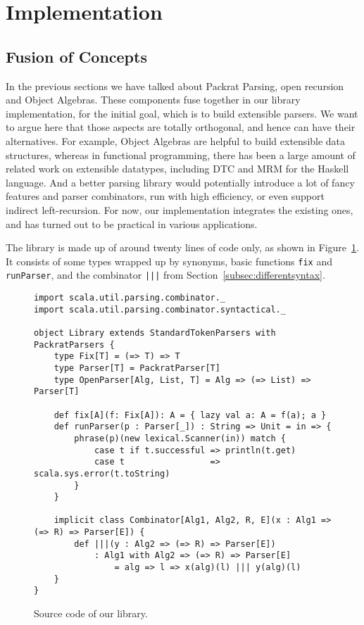 \section{Implementation}\label{sec:implementation}

\subsection{Fusion of Concepts}\label{subsec:fusion}

In the previous sections we have talked about Packrat Parsing, open recursion and Object Algebras. These components fuse together in our library implementation, for the initial goal, which is to build extensible parsers. We want to argue here that those aspects are totally orthogonal, and hence can have their alternatives. For example, Object Algebras are helpful to build extensible data structures, whereas in functional programming, there has been a large amount of related work on extensible datatypes, including DTC and MRM for the Haskell language. And a better
parsing library would potentially introduce a lot of fancy features and parser combinators, run with high efficiency, or even support indirect left-recursion.
 For now, our implementation integrates the existing ones, and has turned out to be practical in various applications.

The library is made up of around twenty lines of code only, as shown in Figure~\ref{fig:sourcelibrary}. It consists of some types wrapped up by synonyms, basic functions \lstinline{fix} and \lstinline{runParser}, and the combinator \lstinline{|||} from Section~\ref{subsec:differentsyntax}.

\begin{figure}[htbp]
\centering
\begin{lstlisting}
import scala.util.parsing.combinator._
import scala.util.parsing.combinator.syntactical._

object Library extends StandardTokenParsers with PackratParsers {
    type Fix[T] = (=> T) => T
    type Parser[T] = PackratParser[T]
    type OpenParser[Alg, List, T] = Alg => (=> List) => Parser[T]

    def fix[A](f: Fix[A]): A = { lazy val a: A = f(a); a }
    def runParser(p : Parser[_]) : String => Unit = in => {
        phrase(p)(new lexical.Scanner(in)) match {
            case t if t.successful => println(t.get)
            case t                 => scala.sys.error(t.toString)
        }
    }

    implicit class Combinator[Alg1, Alg2, R, E](x : Alg1 => (=> R) => Parser[E]) {
        def |||(y : Alg2 => (=> R) => Parser[E])
            : Alg1 with Alg2 => (=> R) => Parser[E]
                = alg => l => x(alg)(l) ||| y(alg)(l)
    }
}
\end{lstlisting}
\caption{Source code of our library.}\label{fig:sourcelibrary}
\end{figure}

